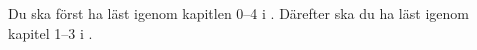 Du ska först ha läst igenom kapitlen 0--4 i \cite{Brookshear2012csa}.
Därefter ska du ha läst igenom kapitel 1--3 i  
\cite{Oetiker2011lshort}.
